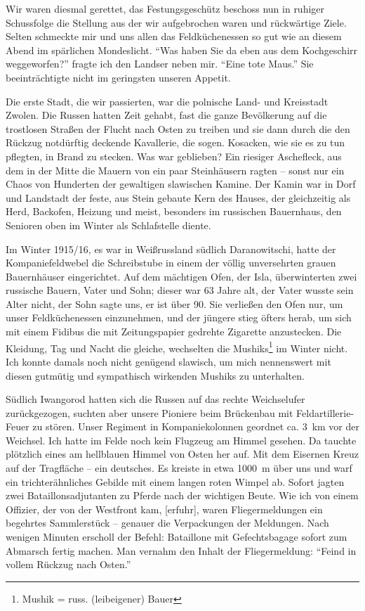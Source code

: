 Wir waren diesmal gerettet, das Festungsgeschütz beschoss nun in ruhiger Schussfolge die Stellung aus der wir aufgebrochen waren und rückwärtige Ziele. Selten schmeckte mir und uns allen das Feldküchenessen so gut wie an diesem Abend im spärlichen Mondeslicht. \enquote{Was haben Sie da eben aus dem Kochgeschirr weggeworfen?} fragte ich den Landser neben mir. \enquote{Eine tote Maus.} Sie beeinträchtigte nicht im geringsten unseren Appetit.

Die erste Stadt, die wir passierten, war die polnische Land- und Kreisstadt Zwolen. Die Russen hatten Zeit gehabt, fast die ganze Bevölkerung auf die trostlosen Straßen der Flucht nach Osten zu treiben und sie dann durch die den Rückzug notdürftig deckende Kavallerie, die sogen. Kosacken, wie sie es zu tun pflegten, in Brand zu stecken. Was war geblieben? Ein riesiger Aschefleck, aus dem in der Mitte die Mauern von ein paar Steinhäusern ragten -- sonst nur ein Chaos von Hunderten der gewaltigen slawischen Kamine. Der Kamin war in Dorf und Landstadt der feste, aus Stein gebaute Kern des Hauses, der gleichzeitig als Herd, Backofen, Heizung und meist, besonders im russischen Bauernhaus, den Senioren oben im Winter als Schlafstelle diente.

Im Winter 1915/16, es war in Weißrussland südlich Daranowitschi, hatte der Kompaniefeldwebel die Schreibstube in einem der völlig unversehrten grauen Bauernhäuser eingerichtet. Auf dem mächtigen Ofen, der Isla, überwinterten zwei russische Bauern, Vater und Sohn; dieser war 63 Jahre alt, der Vater wusste sein Alter nicht, der Sohn sagte uns, er ist über 90. Sie verließen den Ofen nur, um unser Feldküchenessen einzunehmen, und der jüngere stieg öfters herab, um sich mit einem Fidibus die mit Zeitungspapier gedrehte Zigarette anzustecken. Die Kleidung, Tag und Nacht die gleiche, wechselten die Mushiks\footnote{Mushik = russ. (leibeigener) Bauer} im Winter nicht. Ich konnte damals noch nicht genügend slawisch, um mich nennenswert mit diesen gutmütig und sympathisch wirkenden Mushiks zu unterhalten.

Südlich Iwangorod hatten sich die Russen auf das rechte Weichselufer zurückgezogen, suchten aber unsere Pioniere beim Brückenbau mit Feldartillerie-Feuer zu stören. Unser Regiment in Kompaniekolonnen geordnet ca. 3~km vor der Weichsel. Ich hatte im Felde noch kein Flugzeug am Himmel gesehen. Da tauchte plötzlich eines am hellblauen Himmel von Osten her auf. Mit dem Eisernen Kreuz auf der Tragfläche -- ein deutsches. Es kreiste in etwa 1000~m über uns und warf ein trichterähnliches Gebilde mit einem langen roten Wimpel ab. Sofort jagten zwei Bataillonsadjutanten zu Pferde nach der wichtigen Beute. Wie ich von einem Offizier, der von der Westfront kam, [erfuhr], waren Fliegermeldungen ein begehrtes Sammlerstück -- genauer die Verpackungen der Meldungen. Nach wenigen Minuten erscholl der Befehl: Bataillone mit Gefechtsbagage sofort zum Abmarsch fertig machen. Man vernahm den Inhalt der Fliegermeldung: \enquote{Feind in vollem Rückzug nach Osten.}

